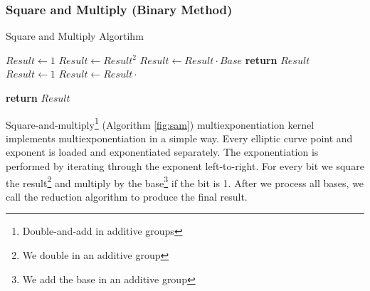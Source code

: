 \subsubsection{Square and Multiply (Binary Method)}

\begin{algorithm}[h]
    \caption{Square and Multiply Algortihm }\label{fig:sam}
    \begin{algorithmic}[1]
    
        \State $Result \gets 1$
            \State $Result \gets Result^2$
                \State $Result \gets Result \cdot Base$
            \EndIf
        \EndFor
        \State \textbf{return} $Result$
    \EndFunction
    \\
        \State $Result \gets 1$
            \State $Result \gets Result \cdot $
        \EndFor
    
        \State \textbf{return} $Result$
        
    \EndFunction
    \end{algorithmic}
\end{algorithm}
Square-and-multiply\footnote{Double-and-add in additive groups} \cite{knuth2014art} (Algorithm \ref{fig:sam}) multiexponentiation kernel implements multiexponentiation in a simple way. Every elliptic curve point and exponent is loaded and exponentiated separately. The exponentiation is performed by iterating through the exponent left-to-right. For every bit we square the result\footnote{We double in an additive group} and multiply by the base\footnote{We add the base in an additive group} if the bit is 1. After we process all bases, we call the reduction algorithm to produce the final result.

\FloatBarrier
